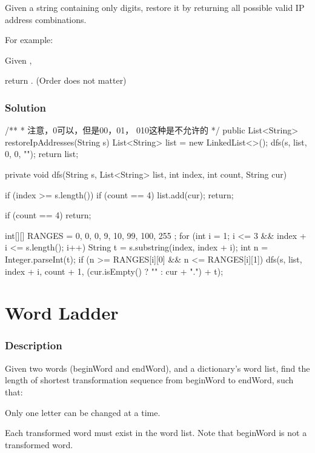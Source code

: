 Given a string containing only digits, restore it by returning all possible valid IP address combinations.

For example:

Given ,

return \code{["255.255.11.135", "255.255.111.35"]}. (Order does not matter)

\subsubsection{Solution}

\begin{Code}
/**
 * 注意，0可以，但是00，01， 010这种是不允许的
 */
public List<String> restoreIpAddresses(String s) {
    List<String> list = new LinkedList<>();
    dfs(s, list, 0, 0, "");
    return list;
}

private void dfs(String s, List<String> list, int index, int count, String cur) {
    if (index >= s.length()) {
        if (count == 4) {
            list.add(cur);
        }
        return;
    }

    if (count == 4) {
        return;
    }

    int[][] RANGES = {
            {0, 0}, {0, 9}, {10, 99}, {100, 255}
    };
    for (int i = 1; i <= 3 && index + i <= s.length(); i++) {
        String t = s.substring(index, index + i);
        int n = Integer.parseInt(t);
        if (n >= RANGES[i][0] && n <= RANGES[i][1]) {
            dfs(s, list, index + i, count + 1, (cur.isEmpty() ? "" : cur + ".") + t);
        }
    }
}
\end{Code}

\newpage

\section{Word Ladder} %

\subsubsection{Description}

Given two words (beginWord and endWord), and a dictionary's word list, find the length of shortest transformation sequence from beginWord to endWord, such that:

Only one letter can be changed at a time.

Each transformed word must exist in the word list. Note that beginWord is not a transformed word.


